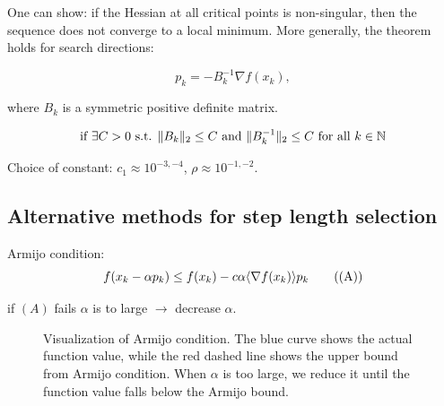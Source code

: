 One can show: if the Hessian at all critical points is non-singular, then the sequence does not converge to a local minimum.
More generally, the theorem holds for search directions:

\[
    p_k = - B_k^{-1} \nabla f(x_k),
\]

where $B_k$ is a symmetric positive definite matrix.

\[
    \text{if } \exists C > 0 \text{ s.t. } \lVert B_k\rVert_2 \leq C \text{ and } \lVert B_k^{-1}\rVert_2 \leq C \text{ for all } k \in \mathbb{N}
\]

Choice of constant: $c_1 \approx 10^{-3,-4}$, $\rho \approx 10^{-1,-2}$.

\subsection*{Alternative methods for step length selection}

Armijo condition:
\[
    f(x_k - \alpha p_k) \leq f(x_k) - c \alpha \langle\nabla f(x_k)\rangle{p_k} \tag{(A)}
\]

if $(A)$ fails $\alpha$ is to large $\to$ decrease $\alpha$.

\begin{figure}[H]
    \centering
    \caption{Visualization of Armijo condition. The blue curve shows the actual function value, while the red dashed line shows the upper bound from Armijo condition. When $\alpha$ is too large, we reduce it until the function value falls below the Armijo bound.}
\end{figure}

